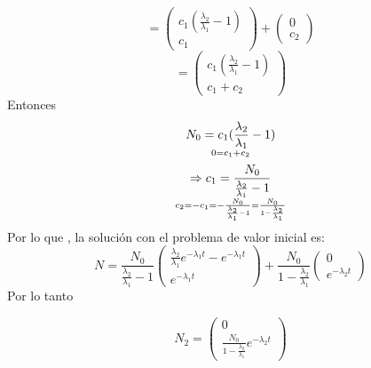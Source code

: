 \begin{equation*}
    =\begin{pmatrix}
c_{1}(\frac{\lambda_{2}}{\lambda_{1}} - 1) \\
c_{1}
\end{pmatrix}  
+ \begin{pmatrix}
0 \\
c_{2}
\end{pmatrix}
\end{equation*}
\begin{equation*}
    =\begin{pmatrix}
    c_{1}(\frac{\lambda_{2}}{\lambda_{1}} - 1) \\
    c_{1}+c_{2}
    \end{pmatrix}
\end{equation*}
Entonces
\begin{equation*}
    N_{0}= c_{1}(\frac{\lambda_{2}}{\lambda_{1}} - 1) \atop
    0 = c_{1}+c_{2}
\end{equation*}
\begin{equation*}
    \Rightarrow c_{1}= \frac{N_{0}}{\frac{\lambda_{2}}{\lambda_{1}} - 1} \atop
    c_{2}= -c_{1}=-\frac{N_{0}}{\frac{\lambda_{2}}{\lambda_{1}} - 1} =\frac{N_{0}}{1 -\frac{\lambda_{2}}{\lambda_{1}} } 
\end{equation*}
Por lo  que , la solución con el problema de valor inicial es:
\begin{equation}
     N=\frac{N_{0}}{\frac{\lambda_{2}}{\lambda_{1}} - 1}\begin{pmatrix}
\frac{\lambda_{2}}{\lambda_{1}}e^{-\lambda_{1}t} - e^{-\lambda_{1}t} \\
e^{-\lambda_{1}t}
\end{pmatrix}  
+ \frac{N_{0}}{1 -\frac{\lambda_{2}}{\lambda_{1}} } \begin{pmatrix}
0 \\
e^{-\lambda_{2}t}
\end{pmatrix}
\label{eq:solvalorinicialp5}
\end{equation}
Por lo tanto 


\begin{equation}
    N_{2}=\begin{pmatrix}
    0 \\
    \frac{N_{0}}{1 -\frac{\lambda_{2}}{\lambda_{1}} }e^{-\lambda_{2}t}
    \end{pmatrix}
\end{equation}   


